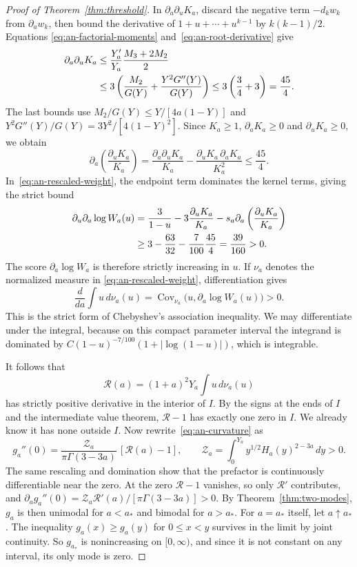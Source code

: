 \begin{proof}[Proof of Theorem~\ref{thm:threshold}]
In $\partial_a\partial_uK_a$, discard the negative term
$-d_kw_k$ from $\partial_aw_k$, then bound the derivative
of $1+u+\cdots+u^{k-1}$ by $k(k-1)/2$. Equations
\eqref{eq:an-factorial-moments} and~\eqref{eq:an-root-derivative} give
\begin{align}
 \partial_a\partial_uK_a
 &\le\frac{Y_a'}{Y_a}\frac{M_3+2M_2}{2}\notag\\
 &\le3\left(\frac{M_2}{G(Y)}+
                       \frac{Y^2G''(Y)}{G(Y)}\right)
 \le3\left(\frac34+3\right)=\frac{45}{4}.
 \label{eq:an-Kau}
\end{align}
The last bounds use
$M_2/G(Y)\le Y/[4a(1-Y)]$ and
$Y^2G''(Y)/G(Y)=3Y^2/[4(1-Y)^2]$.
Since $K_a\ge1$, $\partial_aK_a\ge0$ and
$\partial_uK_a\ge0$, we obtain
\[
 \partial_a\left(\frac{\partial_uK_a}{K_a}\right)
 =\frac{\partial_a\partial_uK_a}{K_a}
  -\frac{\partial_uK_a\,\partial_aK_a}{K_a^2}
 \le\frac{45}{4}.
\]
In~\eqref{eq:an-rescaled-weight}, the endpoint term dominates the kernel
terms, giving the strict bound
\begin{align}
 \partial_u\partial_a\log W_a(u)
 &=\frac3{1-u}-3\frac{\partial_uK_a}{K_a}
    -s_a\partial_a\left(\frac{\partial_uK_a}{K_a}\right)\notag\\
 &\ge3-\frac{63}{32}-\frac7{100}\frac{45}{4}
   =\frac{39}{160}>0.
 \label{eq:an-increasing-score}
\end{align}
The score $\partial_a\log W_a$ is therefore strictly increasing
in $u$. If $\nu_a$ denotes the normalized measure in
\eqref{eq:an-rescaled-weight}, differentiation gives
\[
 \frac{d}{da}\int u\,d\nu_a(u)
 =\operatorname{Cov}_{\nu_a}\bigl(u,\partial_a\log W_a(u)\bigr)>0.
\]
This is the strict form of Chebyshev's association inequality. We may differentiate under the
integral, because on this compact parameter interval the integrand
is dominated by $C(1-u)^{-7/100}(1+|\log(1-u)|)$, which is integrable.

It follows that
\[
 \mathcal R(a)=(1+a)^2Y_a\int u\,d\nu_a(u)
\]
has strictly positive derivative in the interior of $I$. By the signs
at the ends of $I$ and the intermediate value theorem, $\mathcal R-1$
has exactly one zero in $I$. We already know it has none outside $I$.
Now rewrite~\eqref{eq:an-curvature} as
\[
 g_a''(0)=\frac{\mathcal Z_a}{\pi\Gamma(3-3a)}\,[\mathcal R(a)-1],
 \qquad \mathcal Z_a=\int_0^{Y_a}y^{1/2}H_a(y)^{2-3a}\,d y>0.
\]
The same rescaling and domination show that the prefactor is
continuously differentiable near the zero. At the zero
$\mathcal R-1$ vanishes, so only $\mathcal R'$ contributes, and
$\partial_ag_a''(0)=\mathcal Z_a\mathcal R'(a)/[\pi\Gamma(3-3a)]>0$.
By Theorem~\ref{thm:two-modes}, $g_a$ is then unimodal for $a<a_*$
and bimodal for $a>a_*$. For $a=a_*$ itself, let $a\uparrow a_*$. The
inequality $g_a(x)\ge g_a(y)$ for $0\le x<y$ survives in the limit by
joint continuity. So $g_{a_*}$ is nonincreasing on $[0,\infty)$, and
since it is not constant on any interval, its only mode is zero.
\end{proof}


